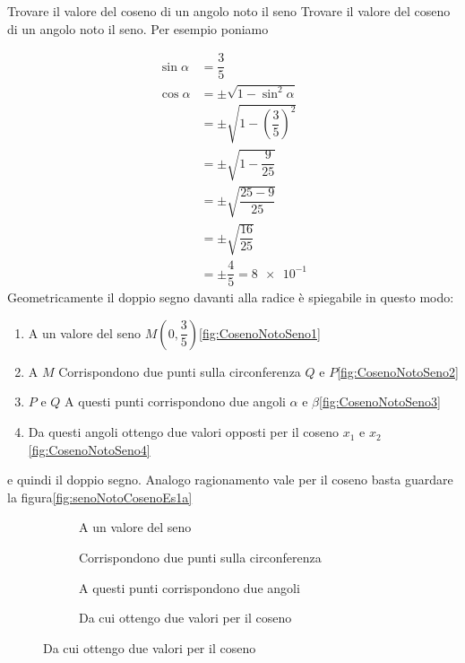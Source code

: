 \begin{esempiot}{Trovare il valore del coseno di un angolo noto il seno}{}
Trovare il valore del coseno di un angolo noto il seno. Per esempio poniamo 
\end{esempiot}
\begin{align*}
\sin\alpha&{}=\dfrac{3}{5}\\
\cos\alpha&=\pm\sqrt{1-\sin^2\alpha}\\
&=\pm\sqrt{1-\left(\dfrac{3}{5}\right)^2}\\
&=\pm\sqrt{1-\dfrac{9}{25}}\\
&=\pm\sqrt{\dfrac{25-9}{25}}\\
&=\pm\sqrt{\dfrac{16}{25}} \\
&=\pm\dfrac{4}{5}=\num{8e-1} 
\end{align*}
Geometricamente il doppio segno davanti alla radice è spiegabile in questo modo:
\begin{enumerate}
	\item A un valore del seno $M(0,\dfrac{3}{5})$\nobs\vref{fig:CosenoNotoSeno1}
	\item A $M$ Corrispondono due punti sulla circonferenza $Q$ e $P$\nobs\vref{fig:CosenoNotoSeno2}
	\item $P$ e $Q$ A questi punti corrispondono due angoli $\alpha$ e $\beta$\nobs\vref{fig:CosenoNotoSeno3}
	\item  Da questi angoli ottengo due valori opposti per il coseno $x_1$ e $x_2$\nobs\vref{fig:CosenoNotoSeno4}
	\end{enumerate}
e quindi il doppio segno.
Analogo ragionamento vale per il coseno basta guardare la figura\nobs\vref{fig:senoNotoCosenoEs1a}
\begin{figure}
	\begin{subfigure}[b]{.5\linewidth}
		\centering
			\caption{A un valore del seno}\label{fig:CosenoNotoSeno1}
	\end{subfigure}%
	\begin{subfigure}[b]{.5\linewidth}
		\centering
			\caption{Corrispondono due punti sulla circonferenza}\label{fig:CosenoNotoSeno2}
	\end{subfigure}
	\begin{subfigure}[b]{.5\linewidth}
		\centering
			\caption{A questi punti corrispondono due angoli}\label{fig:CosenoNotoSeno3}
	\end{subfigure}%
	\begin{subfigure}[b]{.5\linewidth}
		\centering
			\caption{Da cui ottengo due valori per il coseno}\label{fig:CosenoNotoSeno4}
	\end{subfigure}
	\label{fig:CosenoNotoSenoEs1}
\end{figure}
